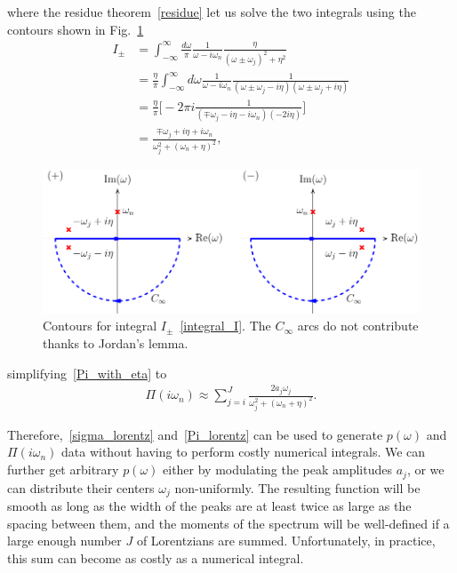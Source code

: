 \documentclass[notitlepage, 11pt, nofootinbib]{revtex4-1}
\begin{document}
where the residue theorem~\eqref{residue} let us solve the two integrals using the contours shown in Fig.~\ref{contour}
\begin{align}
I_{\pm}
&=
\int_{-\infty}^{\infty} \frac{d\omega}{\pi}
\frac{1}{\omega-i\omega_n}
\frac{\eta}{(\omega\pm\omega_j)^2+\eta^2}
\\
&=
\frac{\eta}{\pi}
\int_{-\infty}^{\infty} d\omega
\frac{1}{\omega-i\omega_n}
\frac{1}{
(\omega\pm\omega_j-i\eta)
(\omega\pm\omega_j+i\eta)
}
\label{integral_I}
\\
&=
\frac{\eta}{\pi}
\bigg[
-2\pi i
\frac{1}{(\mp\omega_j-i\eta-i\omega_n)(-2i\eta)}
\bigg]
\\
&=
\frac{
\mp \omega_j + i\eta + i\omega_n
}{
\omega_j^2+(\omega_n+\eta)^2
},
\end{align}
\begin{figure}
\center
\includegraphics{contour.pdf}
\caption{Contours for integral $I_{\pm}$~\eqref{integral_I}. The $C_{\infty}$ arcs do not contribute thanks to Jordan's lemma.}
\label{contour}
\end{figure}
simplifying~\eqref{Pi_with_eta} to
\begin{align}
\Pi(i\omega_n)
\approx
\sum_{j=i}^{J}
\frac{2a_j\omega_j}{\omega_j^2+(\omega_n+\eta)^2}.
\label{Pi_lorentz}
\end{align}

Therefore,~\eqref{sigma_lorentz} and~\eqref{Pi_lorentz} can be used to generate $p(\omega)$ and $\Pi(i\omega_n)$ data without having to perform costly numerical integrals. We can further get arbitrary $p(\omega)$ either by modulating the peak amplitudes $a_j$, or we can distribute their centers $\omega_j$ non-uniformly. The resulting function will be smooth as long as the width of the peaks are at least twice as large as the spacing between them, and the moments of the spectrum will be well-defined if a large enough number $J$ of Lorentzians are summed. Unfortunately, in practice, this sum can become as costly as a numerical integral.
\end{document}

